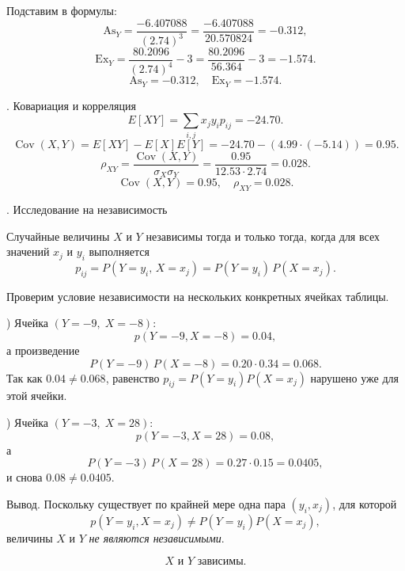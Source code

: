 \documentclass[a4paper,14pt]{extarticle}
\begin{document}
            Подставим в формулы:
            \[
                \mathrm{As}_Y = \frac{-6.407088}{(2.74)^3} = \frac{-6.407088}{20.570824} = -0.312,
            \]
            \[
                \mathrm{Ex}_Y = \frac{ 80.2096}{(2.74)^4} - 3 = \frac{ 80.2096}{56.364} - 3 = -1.574.
            \]
            \[
                \boxed{\mathrm{As}_Y = -0.312, \quad \mathrm{Ex}_Y = -1.574.}
            \]
            
            . Ковариация и корреляция
            \[
                E[XY] = \sum_{i,j} x_j y_i p_{ij} = -24.70.
            \]
            \[
                \operatorname{Cov}(X,Y) = E[XY] - E[X]E[Y] = -24.70 - (4.99 \cdot (-5.14)) = 0.95.
            \]
            \[
                \rho_{XY} = \frac{\operatorname{Cov}(X,Y)}{\sigma_X \sigma_Y} = \frac{0.95}{12.53 \cdot 2.74} = 0.028.
            \]
            \[
                \boxed{\operatorname{Cov}(X,Y) = 0.95, \quad \rho_{XY} = 0.028.}
            \]
            
            . Исследование на независимость
            
            Случайные величины $X$ и $Y$ независимы тогда и только тогда, когда для всех значений $x_j$ и $y_i$ выполняется
            \[
                p_{ij}=P(Y=y_i,\,X=x_j)=P(Y=y_i)\,P(X=x_j).
            \]
            
            Проверим условие независимости на нескольких конкретных ячейках таблицы.
            
            ) Ячейка $(Y=-9,\;X=-8)$:
            \[
                p(Y=-9,X=-8)=0.04,
            \]
            а произведение
            \[
                P(Y=-9)\,P(X=-8)=0.20\cdot0.34=0.068.
            \]
            Так как \(0.04 \neq 0.068\), равенство \(p_{ij}=P(Y=y_i)P(X=x_j)\) нарушено уже для этой ячейки.
            
            ) Ячейка $(Y=-3,\;X=28)$:
            \[
                p(Y=-3,X=28)=0.08,
            \]
            а
            \[
                P(Y=-3)\,P(X=28)=0.27\cdot0.15=0.0405,
            \]
            и снова \(0.08 \neq 0.0405\).
            
            \noindent Вывод. Поскольку существует по крайней мере одна пара \((y_i,x_j)\), для которой
            \[
                p(Y=y_i,X=x_j)\neq P(Y=y_i)P(X=x_j),
            \]
            величины $X$ и $Y$ \emph{не являются независимыми}.
            
            \[
                \boxed{\text{$X$ и $Y$ зависимы.}}
            \]
\end{document}
